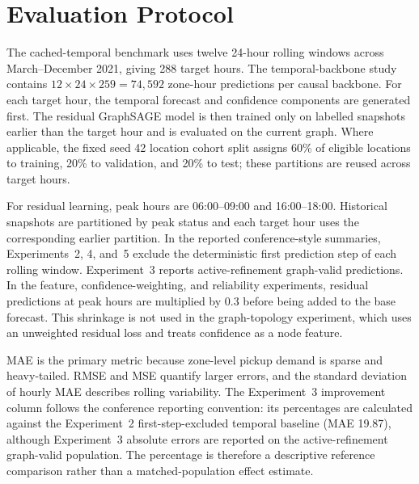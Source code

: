 \documentclass[12pt,a4paper]{report}
\begin{document}
	\section{Evaluation Protocol}
	\label{sec:causal-evaluation-protocol}
	
The cached-temporal benchmark uses twelve 24-hour rolling windows across March--December 2021, giving 288 target hours. The temporal-backbone study contains $12\times24\times259=74{,}592$ zone-hour predictions per causal backbone. For each target hour, the temporal forecast and confidence components are generated first. The residual GraphSAGE model is then trained only on labelled snapshots earlier than the target hour and is evaluated on the current graph. Where applicable, the fixed seed 42 location cohort split assigns 60\% of eligible locations to training, 20\% to validation, and 20\% to test; these partitions are reused across target hours.
	
For residual learning, peak hours are 06:00--09:00 and 16:00--18:00. Historical snapshots are partitioned by peak status and each target hour uses the corresponding earlier partition. In the reported conference-style summaries, Experiments~2, 4, and~5 exclude the deterministic first prediction step of each rolling window. Experiment~3 reports active-refinement graph-valid predictions. In the feature, confidence-weighting, and reliability experiments, residual predictions at peak hours are multiplied by 0.3 before being added to the base forecast. This shrinkage is not used in the graph-topology experiment, which uses an unweighted residual loss and treats confidence as a node feature.
	
	MAE is the primary metric because zone-level pickup demand is sparse and heavy-tailed. RMSE and MSE quantify larger errors, and the standard deviation of hourly MAE describes rolling variability. The Experiment~3 improvement column follows the conference reporting convention: its percentages are calculated against the Experiment~2 first-step-excluded temporal baseline (MAE 19.87), although Experiment~3 absolute errors are reported on the active-refinement graph-valid population. The percentage is therefore a descriptive reference comparison rather than a matched-population effect estimate.
	
\end{document}
